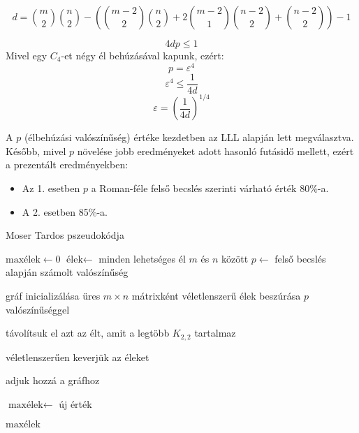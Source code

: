 \documentclass[12pt,a4paper]{article}
\begin{document}
\begin{itemize}
\begin{enumerate}
        \[
        d = \binom{m}{2} \binom{n}{2} 
        - \left( 
        \binom{m-2}{2} \binom{n}{2} 
        + 2 \binom{m-2}{1} \binom{n-2}{2} 
        + \binom{n-2}{2} 
        \right) - 1
        \]
        
        \[
        4dp \leq 1
        \]
Mivel egy $C_4$-et négy él behúzásával kapunk, ezért:
        \[
         p = \varepsilon^4
        \]
        \[
        \varepsilon^4 \leq \frac{1}{4d}
        \]
        \[
        \varepsilon = \left( \frac{1}{4d} \right)^{1/4}
        \]
    \end{enumerate}

    A $p$ (élbehúzási valószínűség) értéke kezdetben az LLL alapján lett megválasztva. Később, mivel $p$ növelése jobb eredményeket adott hasonló futásidő mellett, ezért a prezentált eredményekben:
    \begin{itemize}
        \item Az 1. esetben $p$ a Roman-féle felső becslés szerinti várható érték 80\%-a.
        \item A 2. esetben 85\%-a.
    \end{itemize}
\end{itemize}

\begin{algorithm}[H]
\caption{Moser Tardos pszeudokódja}
\begin{algorithmic}[1]

    \State $\text{maxélek} \gets 0$
    \State $\text{élek} \gets$ minden lehetséges él $m$ és $n$ között
    \State $p \gets$ felső becslés alapján számolt valószínűség

        \State gráf inicializálása üres $m \times n$ mátrixként
        \State véletlenszerű élek beszúrása $p$ valószínűséggel

            \State távolítsuk el azt az $\text{élt}$, amit a legtöbb $K_{2,2}$ tartalmaz
        \EndWhile

        \State véletlenszerűen keverjük az éleket

                \State adjuk hozzá a gráfhoz
            \EndIf
        \EndFor

            \State $\text{maxélek} \gets$ új érték
        \EndIf
    \EndFor

    \State \Return $\text{maxélek}$
\EndFunction

\end{algorithmic}
\end{algorithm}
\end{document}
